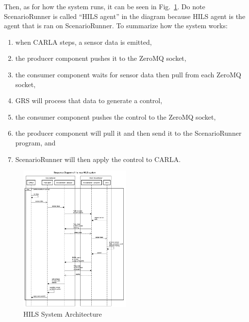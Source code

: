 Then, as for how the system runs, it can be seen in
Fig.~\ref{section-3-hils-sequence-diagram}. Do note ScenarioRunner is called
``HILS agent'' in the diagram because HILS agent is the agent that is ran on
ScenarioRunner. To summarize how the system works:
\begin{enumerate}
	\item when CARLA steps, a sensor data is emitted,
	\item the producer component pushes it to the ZeroMQ socket,
	\item the consumer component waits for sensor data then pull from each
	      ZeroMQ socket,
	\item GRS will process that data to generate a control,
	\item the consumer component pushes the control to the ZeroMQ socket,
	\item the producer component will pull it and then send it to the
	      ScenarioRunner program, and
	\item ScenarioRunner will then apply the control to CARLA.
\end{enumerate}

\begin{figure}[htbp]
	\centerline{\includegraphics[width=0.5\textwidth]{resources/chapter-3/sequence-diagram-new-hils-kasar-EN.png}}
	\caption{HILS System Architecture}
	\label{section-3-hils-sequence-diagram}
\end{figure}

